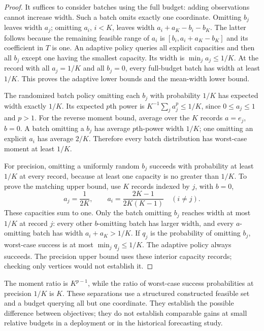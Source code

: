 \begin{proof}
It suffices to consider batches using the full budget: adding observations
cannot increase width. Such a batch omits exactly one coordinate.
Omitting $b_j$ leaves width $a_j$; omitting $a_i$, $i<K$, leaves width
$a_i+a_K-b_i-b_K$. The latter follows because the remaining feasible
range of $a_i$ is $[b_i,a_i+a_K-b_K]$ and its coefficient in $T$ is one.
An adaptive policy queries all explicit capacities and then all $b_j$
except one having the smallest capacity. Its width is
$\min_j a_j\le1/K$. At the record with all $a_j=1/K$ and all $b_j=0$,
every full-budget batch has width at least $1/K$. This proves the
adaptive lower bounds and the mean-width lower bound.

The randomized batch policy omitting each $b_j$ with probability $1/K$
has expected width exactly $1/K$. Its expected $p$th power is
$K^{-1}\sum_j a_j^p\le1/K$, since $0\le a_j\le1$ and $p>1$.
For the reverse moment bound, average over the $K$ records
$a=e_j$, $b=0$. A batch omitting a $b_j$ has average $p$th-power width
$1/K$; one omitting an explicit $a_i$ has average $2/K$.
Therefore every batch distribution has worst-case moment at least $1/K$.

For precision, omitting a uniformly random $b_j$ succeeds with
probability at least $1/K$ at every record, because at least one capacity
is no greater than $1/K$. To prove the matching upper bound, use $K$
records indexed by $j$, with $b=0$,
\[
 a_j=\frac{1}{2K},\qquad
 a_i=\frac{2K-1}{2K(K-1)}\quad(i\ne j).
\]
These capacities sum to one. Only the batch omitting $b_j$ reaches
width at most $1/K$ at record $j$: every other $b$-omitting batch has larger
width, and every $a$-omitting batch has width $a_i+a_K>1/K$.
If $q_j$ is the probability of omitting $b_j$, worst-case success is
at most $\min_j q_j\le1/K$. The adaptive policy always succeeds.
The precision upper bound uses these interior capacity records;
checking only vertices would not establish it.
\end{proof}

The moment ratio is $K^{p-1}$, while the ratio of worst-case success
probabilities at precision $1/K$ is $K$. These separations use a
structured constructed feasible set and a budget querying all but one
coordinate. They establish the possible difference between objectives;
they do not establish comparable gains at small relative budgets in a
deployment or in the historical forecasting study.
